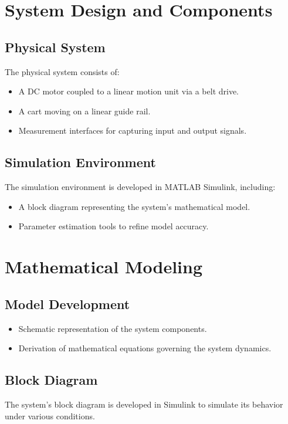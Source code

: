 \documentclass{article}
\begin{document}
\section{System Design and Components}
\subsection{Physical System}
The physical system consists of:
\begin{itemize}
    \item A DC motor coupled to a linear motion unit via a belt drive.
    \item A cart moving on a linear guide rail.
    \item Measurement interfaces for capturing input and output signals.
\end{itemize}

\subsection{Simulation Environment}
The simulation environment is developed in MATLAB Simulink, including:
\begin{itemize}
    \item A block diagram representing the system's mathematical model.
    \item Parameter estimation tools to refine model accuracy.
\end{itemize}

\section{Mathematical Modeling}
\subsection{Model Development}
\begin{itemize}
    \item Schematic representation of the system components.
    \item Derivation of mathematical equations governing the system dynamics.
\end{itemize}

\subsection{Block Diagram}
The system's block diagram is developed in Simulink to simulate its behavior under various conditions.
\end{document}
